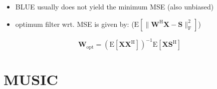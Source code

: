 \documentclass[english]{latex4ei/latex4ei_sheet}
\begin{document}
\begin{sectionbox}
  \begin{itemize}
    \item BLUE usually does not yield the minimum MSE (also unbiased)
    \item optimum filter wrt. MSE is given by: ($\mathrm{E}[\|\boldsymbol{W}^{\mathrm{H}} \boldsymbol{X}-\boldsymbol{S}\|_{\mathrm{F}}^{2}]$)
  \end{itemize}
  $$\boldsymbol{W}_{\mathrm{opt}}=\left(\mathrm{E}\left[\boldsymbol{X} \boldsymbol{X}^{\mathrm{H}}\right]\right)^{-1} \mathrm{E}\left[\boldsymbol{X} \boldsymbol{S}^{\mathrm{H}}\right]$$
\end{sectionbox}

\section{MUSIC}
\end{document}
